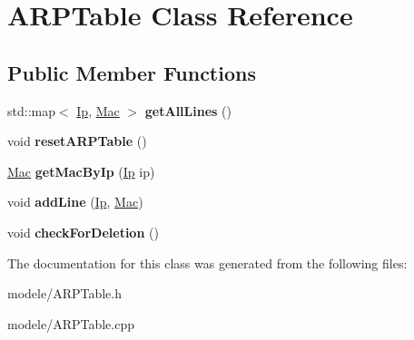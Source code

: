 \hypertarget{class_a_r_p_table}{\section{A\-R\-P\-Table Class Reference}
\label{class_a_r_p_table}
}
\subsection*{Public Member Functions}
\begin{DoxyCompactItemize}
\item 
\hypertarget{class_a_r_p_table_aecc87c7ec70aaa600d884fc102cc699c}{std\-::map$<$ \hyperlink{class_ip}{Ip}, \hyperlink{class_mac}{Mac} $>$ {\bfseries get\-All\-Lines} ()}\label{class_a_r_p_table_aecc87c7ec70aaa600d884fc102cc699c}

\item 
\hypertarget{class_a_r_p_table_a6160a7477960d24600e671b5dd623f26}{void {\bfseries reset\-A\-R\-P\-Table} ()}\label{class_a_r_p_table_a6160a7477960d24600e671b5dd623f26}

\item 
\hypertarget{class_a_r_p_table_a5068f999a6f5fcdcf898f9707b19e5c8}{\hyperlink{class_mac}{Mac} {\bfseries get\-Mac\-By\-Ip} (\hyperlink{class_ip}{Ip} ip)}\label{class_a_r_p_table_a5068f999a6f5fcdcf898f9707b19e5c8}

\item 
\hypertarget{class_a_r_p_table_a91f8644d9f5b61b626318f85c6bbcb28}{void {\bfseries add\-Line} (\hyperlink{class_ip}{Ip}, \hyperlink{class_mac}{Mac})}\label{class_a_r_p_table_a91f8644d9f5b61b626318f85c6bbcb28}

\item 
\hypertarget{class_a_r_p_table_abe88a94f38b7913eb70536fe024b7650}{void {\bfseries check\-For\-Deletion} ()}\label{class_a_r_p_table_abe88a94f38b7913eb70536fe024b7650}

\end{DoxyCompactItemize}


The documentation for this class was generated from the following files\-:\begin{DoxyCompactItemize}
\item 
modele/A\-R\-P\-Table.\-h\item 
modele/A\-R\-P\-Table.\-cpp\end{DoxyCompactItemize}
